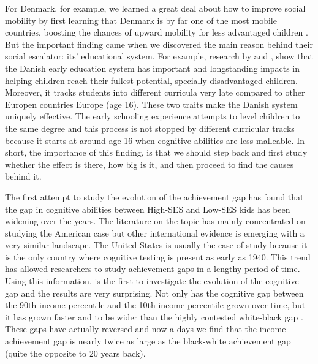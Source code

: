 \documentclass[11pt, a4paper]{article}\usepackage[]{graphicx}\usepackage[]{color}
\begin{document}
For Denmark, for example, we learned a great deal about how to improve social mobility by first learning that Denmark is by far one of the most mobile countries, boosting the chances of upward mobility for less advantaged children \citep{bjorklund2009, jaeger2007}. But the important finding came when we discovered the main reason behind their social escalator: its' educational system. For example, research by \citet{esping_waldfogel2012} and \citet{bauchmuller2014}, show that the Danish early education system has important and longstanding impacts in helping children reach their fullest potential, specially disadvantaged children. Moreover, it tracks students into different curricula very late compared to other Europen countries Europe (age 16). These two traits make the Danish system uniquely effective. The early schooling experience attempts to level children to the same degree and this process is not stopped by different curricular tracks because it starts at around age 16 when cognitive abilities are less malleable. In short, the importance of this finding, is that we should step back and first study whether the effect is there, how big is it, and then proceed to find the causes behind it.

The first attempt to study the evolution of the achievement gap has found that the gap in cognitive abilities between High-SES and Low-SES kids has been widening over the years. The literature on the topic has mainly concentrated on studying the American case \citep{reardon2011} but other international evidence is emerging with a very similar landscape. The United States is usually the case of study because it is the only country where cognitive testing is present as early as 1940. This trend has allowed researchers to study achievement gaps in a lengthy period of time. Using this information, \citet{reardon2011} is the first to investigate the evolution of the cognitive gap and the results are very surprising. Not only has the cognitive gap between the 90th income percentile and the 10th income percentile grown over time, but it has grown faster and to be wider than the highly contested white-black gap \citet{magnuson2008}. These gaps have actually reversed and now a days we find that the income achievement gap is nearly twice as large as the black-white achievement gap (quite the opposite to 20 years back).
\end{document}
